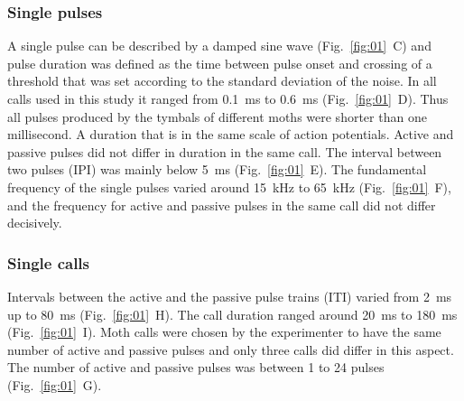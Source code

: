 \documentclass[12pt,a4paper]{article}
\newcommand{\fig}[2]{(Fig.~#1~#2)}
\begin{document}
\subsubsection{Single pulses}
A single pulse can be described by a damped sine wave \fig{\ref{fig:01}}{C} and pulse duration was defined as the time between pulse onset and crossing of a threshold that was set according to the standard deviation of the noise. In all calls used in this study it ranged from 0.1~ms to 0.6~ms \fig{\ref{fig:01}}{D}. Thus all pulses produced by the tymbals of different moths were shorter than one millisecond. A duration that is in the same scale of action potentials. Active and passive pulses did not differ in duration in the same call. The interval between two pulses (IPI) was mainly below 5~ms \fig{\ref{fig:01}}{E}. The fundamental frequency of the single pulses varied around 15~kHz to 65~kHz \fig{\ref{fig:01}}{F}, and the frequency for active and passive pulses in the same call did not differ decisively.

\subsubsection{Single calls}
Intervals between the active and the passive pulse trains (ITI) varied from 2~ms up to 80~ms \fig{\ref{fig:01}}{H}. The call duration ranged around 20~ms to 180~ms \fig{\ref{fig:01}}{I}. Moth calls were chosen by the experimenter to have the same number of active and passive pulses and only three calls did differ in this aspect. The number of active and passive pulses was between 1 to 24 pulses \fig{\ref{fig:01}}{G}.
\end{document}

